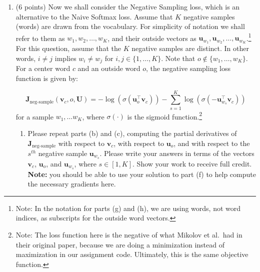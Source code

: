 \documentclass{article}
\begin{document}
\begin{enumerate}[label=(\alph*)]
\item (6 points) Now we shall consider the Negative Sampling loss, which is an alternative to the Naive Softmax loss.  Assume that $K$ negative samples (words) are drawn from the vocabulary. For simplicity of notation we shall refer to them as $w_1, w_2, \dots, w_K$, and their outside vectors as $\bm u_{w_1}, \bm u_{w_2}, \dots, \bm u_{w_K}$.\footnote{Note: In the notation for parts (g) and (h), we are using words, not word indices, as subscripts for the outside word vectors.} For this question, assume that the $K$ negative samples are distinct. In other words, $i\neq j$ implies $w_i\neq w_j$ for $i,j\in\{1,\dots,K\}$.
Note that $o\notin\{w_1, \dots, w_K\}$. 
For a center word $c$ and an outside word $o$, the negative sampling loss function is given by:

\begin{equation}
\bm J_{\text{neg-sample}}(\bm v_c, o, \bm U) = -\log(\sigma(\bm u_o^\top \bm v_c)) - \sum_{s=1}^K \log(\sigma(-\bm u_{w_s}^\top \bm v_c))
\end{equation}
for a sample $w_1, \ldots w_K$, where $\sigma(\cdot)$ is the sigmoid function.\footnote{Note: The loss function here is the negative of what Mikolov et al.\ had in their original paper, because we are doing a minimization instead of maximization in our assignment code. Ultimately, this is the same objective function.}

\begin{enumerate}[label=(\roman*)]
\item Please repeat parts (b) and (c), computing the partial derivatives of $\bm J_{\text{neg-sample}}$ with respect to $\bm v_c$, with respect to $\bm u_o$, and with respect to the $s^{th}$ negative sample $\bm u_{w_s}$. Please write your answers in terms of the vectors $\bm v_c$, $\bm u_o$, and $\bm u_{w_s}$, where $s \in [1, K]$. Show your work to receive full credit. \textbf{Note:} you should be able to use your solution to part (f) to help compute the necessary gradients here.


\end{enumerate}
\end{enumerate}
\end{document}

